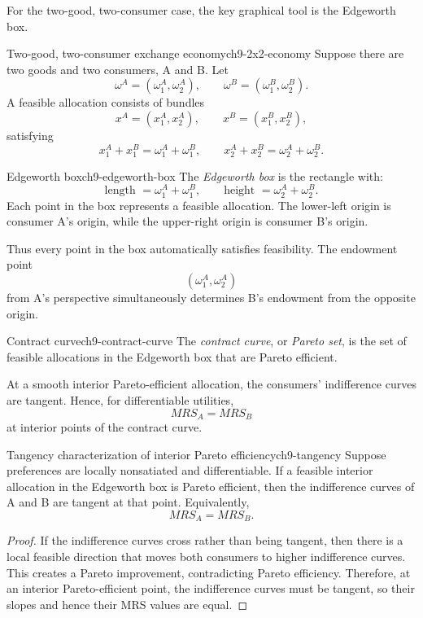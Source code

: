 For the two-good, two-consumer case, the key graphical tool is the Edgeworth box.

\begin{definition}{Two-good, two-consumer exchange economy}{ch9-2x2-economy}
Suppose there are two goods and two consumers, A and B. Let
\[
\omega^A=(\omega_1^A,\omega_2^A),
\qquad
\omega^B=(\omega_1^B,\omega_2^B).
\]
A feasible allocation consists of bundles
\[
x^A=(x_1^A,x_2^A),
\qquad
x^B=(x_1^B,x_2^B),
\]
satisfying
\[
x_1^A+x_1^B = \omega_1^A+\omega_1^B,
\qquad
x_2^A+x_2^B = \omega_2^A+\omega_2^B.
\]
\end{definition}

\begin{definition}{Edgeworth box}{ch9-edgeworth-box}
The \emph{Edgeworth box} is the rectangle with:
\[
\text{length } = \omega_1^A+\omega_1^B,
\qquad
\text{height } = \omega_2^A+\omega_2^B.
\]
Each point in the box represents a feasible allocation. The lower-left origin is consumer A's origin, while the upper-right origin is consumer B's origin.
\end{definition}

Thus every point in the box automatically satisfies feasibility. The endowment point
\[
(\omega_1^A,\omega_2^A)
\]
from A's perspective simultaneously determines B's endowment from the opposite origin.

\begin{definition}{Contract curve}{ch9-contract-curve}
The \emph{contract curve}, or \emph{Pareto set}, is the set of feasible allocations in the Edgeworth box that are Pareto efficient.
\end{definition}

At a smooth interior Pareto-efficient allocation, the consumers' indifference curves are tangent. Hence, for differentiable utilities,
\[
MRS_A = MRS_B
\]
at interior points of the contract curve.

\begin{theorem}{Tangency characterization of interior Pareto efficiency}{ch9-tangency}
Suppose preferences are locally nonsatiated and differentiable. If a feasible interior allocation in the Edgeworth box is Pareto efficient, then the indifference curves of A and B are tangent at that point. Equivalently,
\[
MRS_A = MRS_B.
\]
\end{theorem}

\begin{proof}
If the indifference curves cross rather than being tangent, then there is a local feasible direction that moves both consumers to higher indifference curves. This creates a Pareto improvement, contradicting Pareto efficiency. Therefore, at an interior Pareto-efficient point, the indifference curves must be tangent, so their slopes and hence their MRS values are equal.
\end{proof}

